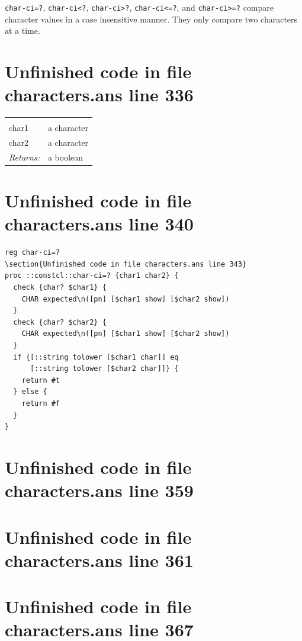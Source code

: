 \documentclass[twoside,9pt]{report}
\begin{document}
\texttt{char-ci=?}, \texttt{char-ci<?}, \texttt{char-ci>?}, \texttt{char-ci<=?}, and \texttt{char-ci>=?} compare character values in a case insensitive manner. They only compare two characters at a time.

\section{Unfinished code in file characters.ans line 336}
\noindent\begin{tabular}{ |p{1.9cm} p{8cm}| }
\hline
\rowcolor[HTML]{CCCCCC} \multicolumn{2}{|l|}{\bf char-ci=?, char-ci<?, char-ci>?, char-ci<=?, char-ci>=? (public)} \\
char1 & a character \\
char2 & a character \\
\textit{Returns:} & a boolean \\
\hline
\end{tabular}
\section{Unfinished code in file characters.ans line 340}
\begin{lstlisting}
reg char-ci=?
\section{Unfinished code in file characters.ans line 343}
proc ::constcl::char-ci=? {char1 char2} {
  check {char? $char1} {
    CHAR expected\n([pn] [$char1 show] [$char2 show])
  }
  check {char? $char2} {
    CHAR expected\n([pn] [$char1 show] [$char2 show])
  }
  if {[::string tolower [$char1 char]] eq
      [::string tolower [$char2 char]]} {
    return #t
  } else {
    return #f
  }
}
\end{lstlisting}
\section{Unfinished code in file characters.ans line 359}
\section{Unfinished code in file characters.ans line 361}
\section{Unfinished code in file characters.ans line 367}
\end{document}
